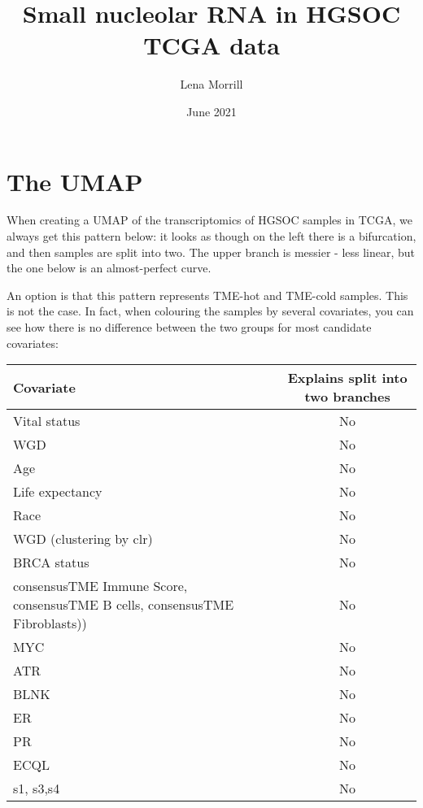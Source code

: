 \documentclass{article}
\title{Small nucleolar RNA in HGSOC TCGA data}
\author{Lena Morrill}
\date{June 2021}
\begin{document}
\maketitle



\section{The UMAP}
When creating a UMAP of the transcriptomics of HGSOC samples in TCGA, we always get this pattern below: it looks as though on the left there is a bifurcation, and then samples are split into two. The upper branch is messier - less linear, but the one below is an almost-perfect curve.

An option is that this pattern represents TME-hot and TME-cold samples. This is not the case. In fact, when colouring the samples by several covariates, you can see how there is no difference between the two groups for most candidate covariates:

\begin{table}[h]
\begin{tabular}{R{3in}|c}
Covariate & Explains split into two branches\\\hline
Vital status & No\\
WGD & No\\
Age & No\\
Life expectancy & No\\
Race & No\\
WGD (clustering by clr) & No\\
BRCA status & No\\
consensusTME Immune Score, consensusTME B cells, consensusTME Fibroblasts)) & No\\
MYC & No\\
ATR & No\\
BLNK & No\\
ER & No\\
PR & No\\
ECQL & No\\
s1, s3,s4 & No\\
\end{tabular}
\end{table}
\end{document}
